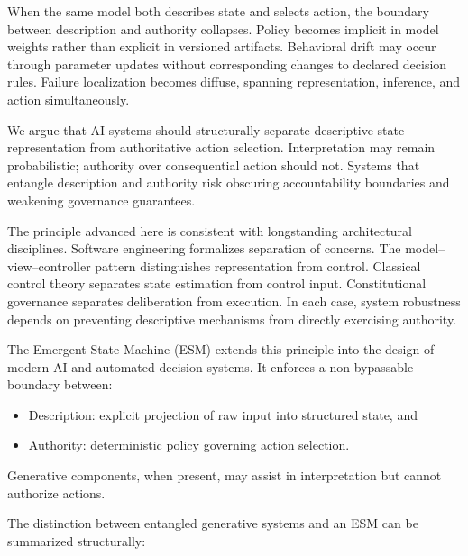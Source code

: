 \documentclass[11pt]{article}
\begin{document}
When the same model both describes state and selects action, the boundary between description and authority collapses. Policy becomes implicit in model weights rather than explicit in versioned artifacts. Behavioral drift may occur through parameter updates without corresponding changes to declared decision rules. Failure localization becomes diffuse, spanning representation, inference, and action simultaneously.

We argue that AI systems should structurally separate descriptive state representation from authoritative action selection. Interpretation may remain probabilistic; authority over consequential action should not. Systems that entangle description and authority risk obscuring accountability boundaries and weakening governance guarantees.

The principle advanced here is consistent with longstanding architectural disciplines. Software engineering formalizes separation of concerns. The model–view–controller pattern distinguishes representation from control. Classical control theory separates state estimation from control input. Constitutional governance separates deliberation from execution. In each case, system robustness depends on preventing descriptive mechanisms from directly exercising authority.

The Emergent State Machine (ESM) extends this principle into the design of modern AI and automated decision systems. It enforces a non-bypassable boundary between:

\begin{itemize}
  \item Description: explicit projection of raw input into structured state, and
  \item Authority: deterministic policy governing action selection.
\end{itemize}

Generative components, when present, may assist in interpretation but cannot authorize actions.

The distinction between entangled generative systems and an ESM can be summarized structurally:
\end{document}
